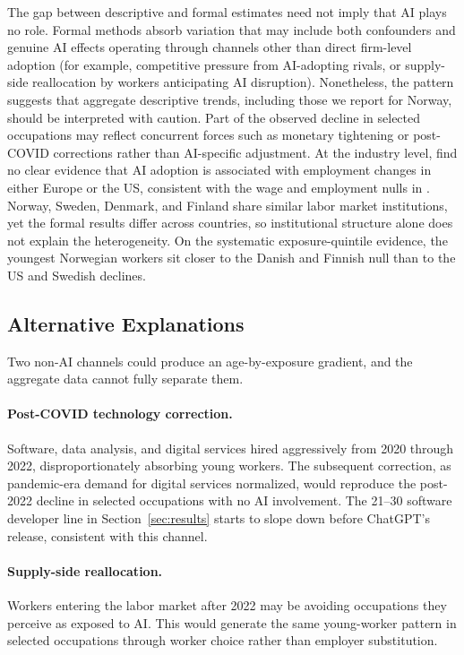 \documentclass[12pt]{article}
\begin{document}
The gap between descriptive and formal estimates need not imply that AI plays no role. Formal methods absorb variation that may include both confounders and genuine AI effects operating through channels other than direct firm-level adoption (for example, competitive pressure from AI-adopting rivals, or supply-side reallocation by workers anticipating AI disruption). Nonetheless, the pattern suggests that aggregate descriptive trends, including those we report for Norway, should be interpreted with caution. Part of the observed decline in selected occupations may reflect concurrent forces such as monetary tightening or post-COVID corrections rather than AI-specific adjustment. At the industry level, \citet{bick2026} find no clear evidence that AI adoption is associated with employment changes in either Europe or the US, consistent with the wage and employment nulls in \citet{humlum2026}. Norway, Sweden, Denmark, and Finland share similar labor market institutions, yet the formal results differ across countries, so institutional structure alone does not explain the heterogeneity. On the systematic exposure-quintile evidence, the youngest Norwegian workers sit closer to the Danish and Finnish null than to the US and Swedish declines.




\subsection{Alternative Explanations}\label{sec:discussion:alternatives}

Two non-AI channels could produce an age-by-exposure gradient, and the aggregate data cannot fully separate them.

\paragraph{Post-COVID technology correction.} Software, data analysis, and digital services hired aggressively from 2020 through 2022, disproportionately absorbing young workers. The subsequent correction, as pandemic-era demand for digital services normalized, would reproduce the post-2022 decline in selected occupations with no AI involvement. The 21--30 software developer line in Section~\ref{sec:results} starts to slope down before ChatGPT's release, consistent with this channel.

\paragraph{Supply-side reallocation.} Workers entering the labor market after 2022 may be avoiding occupations they perceive as exposed to AI. This would generate the same young-worker pattern in selected occupations through worker choice rather than employer substitution.
\end{document}
